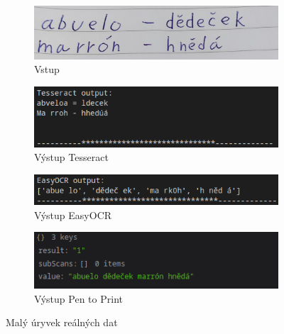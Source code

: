 \documentclass[journal]{IEEEtran}
\begin{document}
\begin{figure}

\begin{subfigure}{\linewidth}
        \centering
        \includegraphics[width=\linewidth]{Images/pageSnippet.jpg}
        \caption{Vstup}
        \label{fig:Test}
\end{subfigure}

\begin{subfigure}{\linewidth}
        \centering
        \includegraphics[width=\linewidth]{Images/Tesseract_PageSnippet.png}
        \caption{Výstup Tesseract}
        \label{fig:Tesseract_Test}
\end{subfigure}

\begin{subfigure}{\linewidth}
        \centering
        \includegraphics[width=\linewidth]{Images/easyOCR_PageSnippet.png}
        \caption{Výstup EasyOCR}
        \label{fig:easyOCR_Test}
\end{subfigure}

\begin{subfigure}{\linewidth}
        \centering
        \includegraphics[width=\linewidth]{Images/penToPrint_PageSnippet.png}
        \caption{Výstup Pen to Print}
        \label{fig:penToPrint_Test}
\end{subfigure}
\caption{Malý úryvek reálných dat}

\end{figure}
\end{document}

